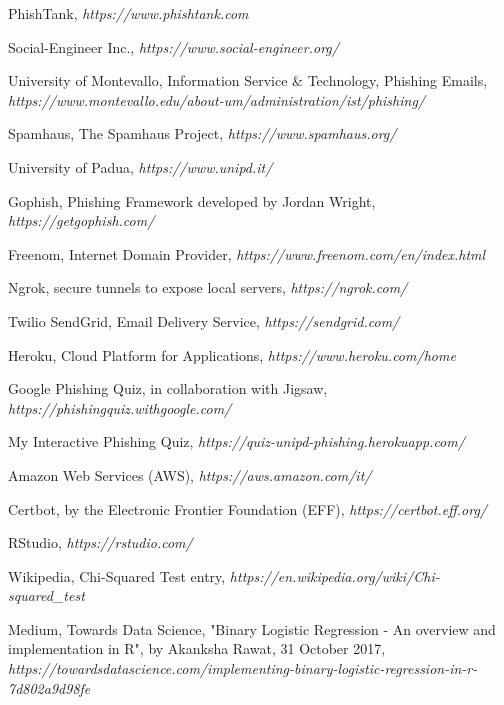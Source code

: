 \documentclass[a4paper]{article}
\begin{document}
\begin{thebibliography}{1}

PhishTank, \textit{https://www.phishtank.com}

Social-Engineer Inc., \textit{https://www.social-engineer.org/}

University of Montevallo, Information Service \& Technology, Phishing Emails, \textit{https://www.montevallo.edu/about-um/administration/ist/phishing/}

Spamhaus, The Spamhaus Project, \textit{https://www.spamhaus.org/}

University of Padua, \textit{https://www.unipd.it/}


Gophish, Phishing Framework developed by Jordan Wright, \textit{https://getgophish.com/}

Freenom, Internet Domain Provider, \textit{https://www.freenom.com/en/index.html}

Ngrok, secure tunnels to expose local servers, \textit{https://ngrok.com/}

Twilio SendGrid, Email Delivery Service, \textit{https://sendgrid.com/}

Heroku, Cloud Platform for Applications, \textit{https://www.heroku.com/home}

Google Phishing Quiz, in collaboration with Jigsaw, \textit{https://phishingquiz.withgoogle.com/}

My Interactive Phishing Quiz, \textit{https://quiz-unipd-phishing.herokuapp.com/}

Amazon Web Services (AWS), \textit{https://aws.amazon.com/it/}

Certbot, by the Electronic Frontier Foundation (EFF), \textit{https://certbot.eff.org/}

RStudio, \textit{https://rstudio.com/}


Wikipedia, Chi-Squared Test entry, \textit{https://en.wikipedia.org/wiki/Chi-squared\_test}

Medium, Towards Data Science, "Binary Logistic Regression -
An overview and implementation in R", by Akanksha Rawat, 31 October 2017, \textit{https://towardsdatascience.com/implementing-binary-logistic-regression-in-r-7d802a9d98fe}


\end{thebibliography}
\end{document}
